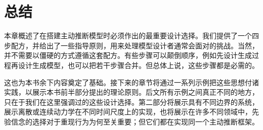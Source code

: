\section{总结}

本章概述了在搭建主动推断模型时必须作出的最重要设计选择。我们提供了一个四步配方，并给出了一些指导原则，用来处理模型设计者通常会面对的挑战。当然，并不需要以僵硬的方式遵循这套配方。有些步骤可以颠倒顺序，例如先设计生成过程再设计生成模型，也可以把若干步骤合并。但总体上说，这些步骤都是必需的。

这也为本书余下内容奠定了基础。接下来的章节将通过一系列示例把这些思想付诸实践，以展示本书前半部分提出的理论原则。后文所有示例之间真正不同的地方，只在于我们在这里强调过的这些设计选择。第二部分将展示具有不同边界的系统，展示离散或连续动力学在不同时间尺度上的实现，也将展示在许多不同领域中，先验信念的选择对于重现行为为何至关重要；但它们都在实现同一个主动推断框架。
